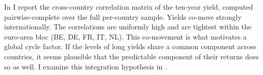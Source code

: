 \begin{table}[t]
  \caption{Summary statistics of zero-coupon yields by country and maturity}
  \label{tab:dh-t1-summary}
  \centering
  
\end{table}


In  I report the cross-country correlation matrix of the
ten-year yield, computed pairwise-complete over the full per-country sample.
Yields co-move strongly internationally. The correlations are
uniformly high and are tightest within the euro-area bloc (BE, DE, FR, IT, NL).
This co-movement is what motivates a global cycle
factor. If the levels of long yields share a common component across countries,
it seems plausible that the predictable component of their returns does so as
well. I examine this integration hypothesis in .

